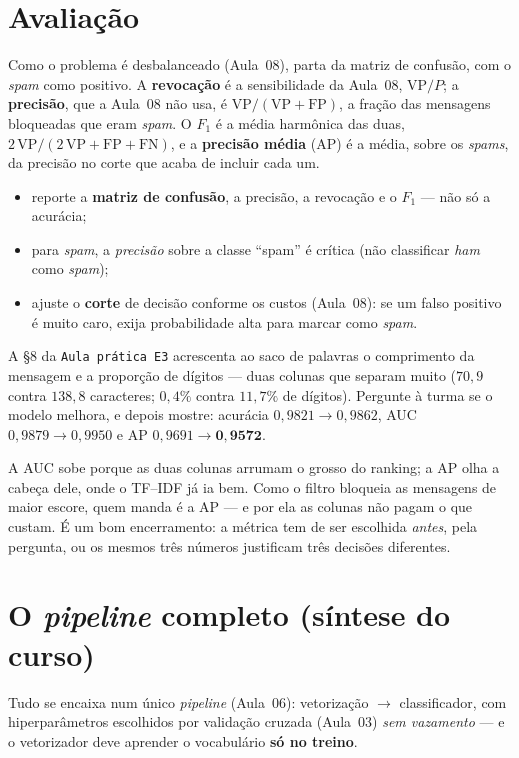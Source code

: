 \documentclass[11pt,a4paper]{article}
\begin{document}
\section{Avaliação}
Como o problema é desbalanceado (Aula~08), parta da matriz de confusão, com o
\emph{spam} como positivo. A \textbf{revocação} é a sensibilidade da Aula~08,
$\text{VP}/P$; a \textbf{precisão}, que a Aula~08 não usa, é $\text{VP}/(\text{VP}+\text{FP})$,
a fração das mensagens bloqueadas que eram \emph{spam}. O \textbf{$F_1$} é a média
harmônica das duas, $2\,\text{VP}/(2\,\text{VP}+\text{FP}+\text{FN})$, e a
\textbf{precisão média} (AP) é a média, sobre os \emph{spams}, da precisão no corte
que acaba de incluir cada um.
\begin{itemize}[leftmargin=1.4cm,nosep]
  \item reporte a \textbf{matriz de confusão}, a precisão, a revocação e o $F_1$
        --- não só a acurácia;
  \item para \emph{spam}, a \emph{precisão} sobre a classe ``spam'' é crítica
        (não classificar \emph{ham} como \emph{spam});
  \item ajuste o \textbf{corte} de decisão conforme os custos (Aula~08): se um falso
        positivo é muito caro, exija probabilidade alta para marcar como \emph{spam}.
\end{itemize}

\begin{emsala}
A §8 da \texttt{Aula prática E3} acrescenta ao saco de palavras o comprimento da
mensagem e a proporção de dígitos --- duas colunas que separam muito ($70{,}9$
contra $138{,}8$ caracteres; $0{,}4\%$ contra $11{,}7\%$ de dígitos). Pergunte à
turma se o modelo melhora, e depois mostre: acurácia $0{,}9821\to0{,}9862$, AUC
$0{,}9879\to0{,}9950$ e AP $0{,}9691\to\mathbf{0{,}9572}$.

A AUC sobe porque as duas colunas arrumam o grosso do ranking; a AP olha a cabeça
dele, onde o TF--IDF já ia bem. Como o filtro bloqueia as mensagens de maior escore,
quem manda é a AP --- e por ela as colunas não pagam o que custam. É um bom
encerramento: a métrica tem de ser escolhida \emph{antes}, pela pergunta, ou os
mesmos três números justificam três decisões diferentes.
\end{emsala}

\section{O \emph{pipeline} completo (síntese do curso)}
Tudo se encaixa num único \emph{pipeline} (Aula~06): vetorização $\to$ classificador,
com hiperparâmetros escolhidos por validação cruzada (Aula~03) \emph{sem vazamento}
--- e o vetorizador deve aprender o vocabulário \textbf{só no treino}.
\end{document}
